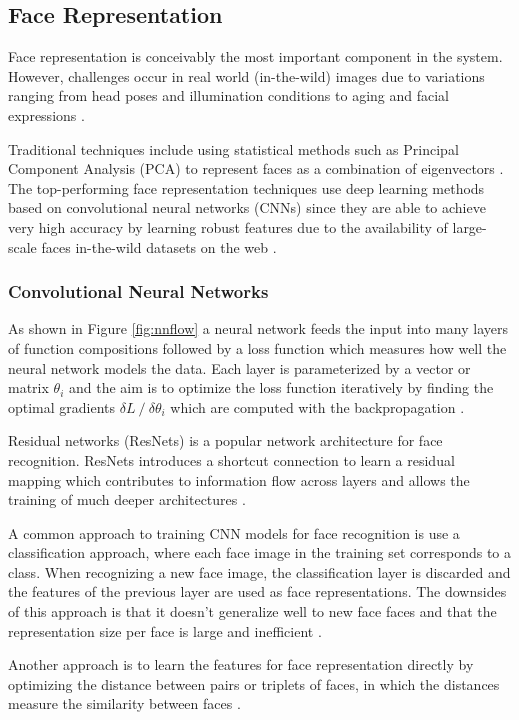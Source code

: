 \documentclass[12pt,english]{article}
\begin{document}
\subsection{Face Representation}

\quad
Face representation is conceivably the most important component in the system. However, challenges occur in real world (in-the-wild) images due to variations ranging from head poses and illumination conditions to aging and facial expressions \cite{trigueros}.

Traditional techniques include using statistical methods such as Principal Component Analysis (PCA) to represent faces as a combination of eigenvectors \cite{amos}. The top-performing face representation techniques use deep learning methods based on convolutional neural networks (CNNs) \cite{amos} since they are able to achieve very high accuracy by learning robust features due to the availability of large-scale faces in-the-wild datasets on the web \cite{trigueros}.  

\subsubsection{Convolutional Neural Networks}
\quad
As shown in Figure \ref{fig:nnflow} a neural network feeds the input into many layers of function compositions followed by a loss function which measures how well the neural network models the data. Each layer is parameterized by a vector or matrix $\theta_{i}$ and the aim is to optimize the loss function iteratively by finding the optimal gradients $\delta L \mathbin{/} \delta  \theta_{i}$ which are computed with the backpropagation \cite{amos}. 

Residual networks (ResNets) is a popular network architecture for face recognition. ResNets introduces a shortcut connection to learn a residual mapping which contributes to information flow across layers and allows the training of much deeper architectures \cite{trigueros}.

A common approach to training CNN models for face recognition is use a classification approach, where each face image in the training set corresponds to a class. When recognizing a new face image, the classification layer is discarded and the features of the previous layer are used as face representations. The downsides of this approach is that it doesn't generalize well to new face faces and that the representation size per face is large and inefficient \cite{schroff}.

Another approach is to learn the features for face representation directly by optimizing the distance between pairs or triplets of faces, in which the distances measure the similarity between faces \cite{trigueros} \cite{schroff}. 
\end{document}
